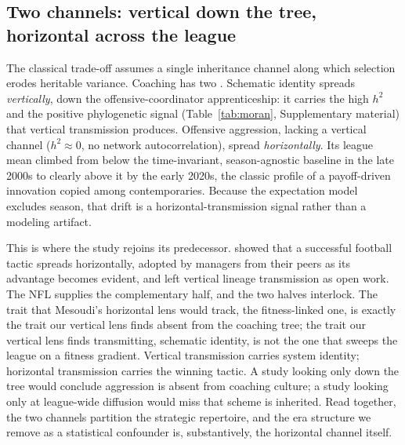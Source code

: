 \documentclass[11pt]{article}
\begin{document}
\subsection{Two channels: vertical down the tree, horizontal across the league}
The classical trade-off assumes a single inheritance channel along which selection
erodes heritable variance. Coaching has two \citep{cavallisforza1981,
boydricherson1985}. Schematic identity spreads \emph{vertically}, down the
offensive-coordinator apprenticeship: it carries the high $h^{2}$ and the positive
phylogenetic signal (Table~\ref{tab:moran}, Supplementary material) that vertical
transmission produces. Offensive aggression, lacking a vertical channel
($h^{2}\approx0$, no network autocorrelation), spread \emph{horizontally}. Its
league mean climbed from below the time-invariant, season-agnostic baseline in the
late 2000s to clearly above it by the early 2020s, the classic profile of a
payoff-driven innovation copied among contemporaries. Because the expectation model
excludes season, that drift is a horizontal-transmission signal rather than a
modeling artifact.

This is where the study rejoins its predecessor. \citet{mesoudi2020} showed that a
successful football tactic spreads horizontally, adopted by managers from their
peers as its advantage becomes evident, and left vertical lineage transmission as
open work. The NFL supplies the complementary half, and the two halves interlock.
The trait that Mesoudi's horizontal lens would track, the fitness-linked one, is
exactly the trait our vertical lens finds absent from the coaching tree; the trait
our vertical lens finds transmitting, schematic identity, is not the one that sweeps
the league on a fitness gradient. Vertical transmission carries system identity;
horizontal transmission carries the winning tactic. A study looking only down the
tree would conclude aggression is absent from coaching culture; a study looking only
at league-wide diffusion would miss that scheme is inherited. Read together, the two
channels partition the strategic repertoire, and the era structure we remove as a
statistical confounder is, substantively, the horizontal channel itself.
\end{document}
